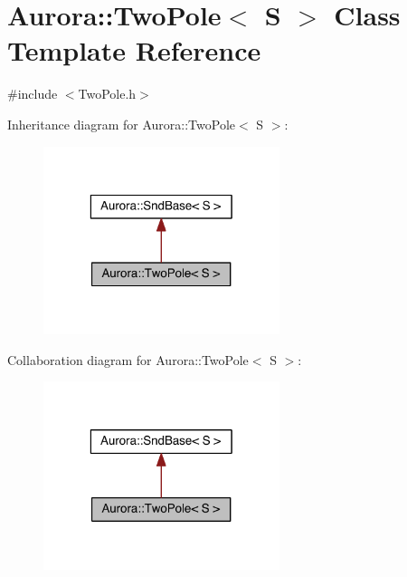 \hypertarget{class_aurora_1_1_two_pole}{}\section{Aurora\+:\+:Two\+Pole$<$ S $>$ Class Template Reference}
\label{class_aurora_1_1_two_pole}


{\ttfamily \#include $<$Two\+Pole.\+h$>$}



Inheritance diagram for Aurora\+:\+:Two\+Pole$<$ S $>$\+:\nopagebreak
\begin{figure}[H]
\begin{center}
\leavevmode
\includegraphics[width=196pt]{class_aurora_1_1_two_pole__inherit__graph}
\end{center}
\end{figure}


Collaboration diagram for Aurora\+:\+:Two\+Pole$<$ S $>$\+:\nopagebreak
\begin{figure}[H]
\begin{center}
\leavevmode
\includegraphics[width=196pt]{class_aurora_1_1_two_pole__coll__graph}
\end{center}
\end{figure}
